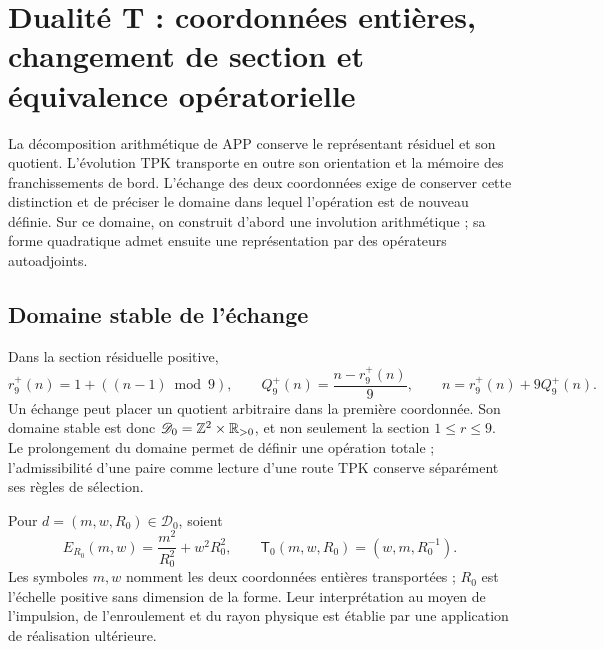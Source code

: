 \section{Dualité T : coordonnées entières, changement de section et équivalence opératorielle}
\label{iv:dualidad}

La décomposition arithmétique de APP conserve le représentant résiduel
et son quotient. L’évolution TPK transporte en outre son orientation et
la mémoire des franchissements de bord. L’échange des deux
coordonnées exige de conserver cette distinction et de préciser le domaine
dans lequel l’opération est de nouveau définie. Sur ce domaine, on
construit d’abord une involution arithmétique ; sa forme quadratique
admet ensuite une représentation par des opérateurs autoadjoints.

\subsection{Domaine stable de l’échange}

Dans la section résiduelle positive,
\begin{equation}
 r_9^+(n)=1+((n-1)\bmod9),\qquad
 Q_9^+(n)=\frac{n-r_9^+(n)}9,
 \qquad n=r_9^+(n)+9Q_9^+(n).
 \label{iv:eq:division-positiva}
\end{equation}
Un échange peut placer un quotient arbitraire dans la première
coordonnée. Son domaine stable est donc
\(\mathscr D_0=\mathbb Z^2\times\mathbb R_{>0}\), et non seulement la section
\(1\leq r\leq9\). Le prolongement du domaine permet de définir
une opération totale ; l’admissibilité d’une paire comme lecture d’une
route TPK conserve séparément ses règles de sélection.

\begin{definition}
\label{iv:def:dualidad}
Pour \(d=(m,w,R_0)\in\mathscr D_0\), soient
\begin{equation}
 E_{R_0}(m,w)=\frac{m^2}{R_0^2}+w^2R_0^2,
 \qquad
 \mathsf T_0(m,w,R_0)=(w,m,R_0^{-1}).
 \label{iv:eq:energia-t}
\end{equation}
Les symboles \(m,w\) nomment les deux coordonnées entières
transportées ; \(R_0\) est l’échelle positive sans dimension de
la forme. Leur interprétation au moyen de l’impulsion, de l’enroulement et du
rayon physique est établie par une application de réalisation ultérieure.
\end{definition}


